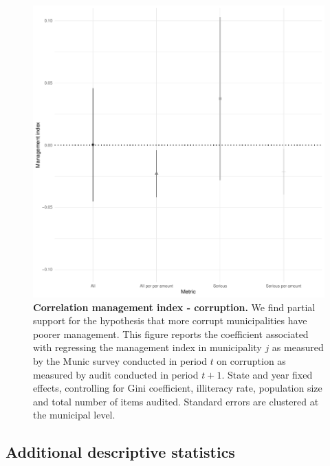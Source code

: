 {\begin{figure}[H]
    \centering
    \includegraphics{chapters/chapter_2/figures/managementCorruption.pdf}
    \caption{{\bf Correlation management index - corruption.} We find partial support for the hypothesis that more corrupt municipalities have poorer management. This figure reports the coefficient associated with regressing the management index in municipality $j$ as measured by the Munic survey conducted in period $t$ on corruption as measured by audit conducted in period $t+1$. State and year fixed effects, controlling for Gini coefficient, illiteracy rate, population size and total number of items audited. Standard errors are clustered at the municipal level.}
    \label{fig:correlationMgmtCorruption}
\end{figure}

\subsection{Additional descriptive statistics}
\label{app:additional_descriptives}

}
